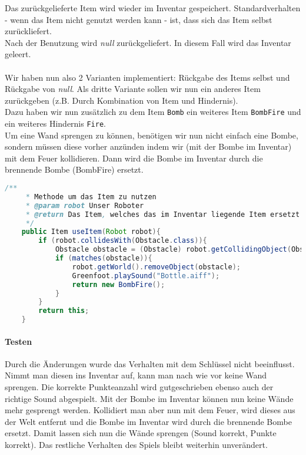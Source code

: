 \documentclass{pi1}
\begin{document}
Das zurückgelieferte Item wird wieder im Inventar gespeichert. Standardverhalten - wenn das Item nicht genutzt werden kann - ist, dass sich das Item selbst zurückliefert.\\
Nach der Benutzung wird \emph{null} zurückgeliefert. In diesem Fall wird das Inventar geleert.\\
\\
Wir haben nun also 2 Varianten implementiert: Rückgabe des Items selbst und Rückgabe von \emph{null}. Als dritte Variante sollen wir nun ein anderes Item zurückgeben (z.B. Durch Kombination von Item und Hindernis).\\
Dazu haben wir nun zusätzlich zu dem Item  \texttt{Bomb} ein weiteres Item \texttt{BombFire} und ein weiteres Hindernis \texttt{Fire}.\\
Um eine Wand sprengen zu können, benötigen wir nun nicht einfach eine Bombe, sondern müssen diese vorher anzünden indem wir (mit der Bombe im Inventar) mit dem Feuer kollidieren. Dann wird die Bombe im Inventar durch die brennende Bombe (BombFire) ersetzt.

\begin{lstlisting}[caption={Klasse \emph{Bomb}, Methode \emph{useItem()}},firstnumber=11, language=Java]
/**
     * Methode um das Item zu nutzen
     * @param robot Unser Roboter
     * @return Das Item, welches das im Inventar liegende Item ersetzt
     */
    public Item useItem(Robot robot){
        if (robot.collidesWith(Obstacle.class)){
            Obstacle obstacle = (Obstacle) robot.getCollidingObject(Obstacle.class);
            if (matches(obstacle)){
                robot.getWorld().removeObject(obstacle);
                Greenfoot.playSound("Bottle.aiff");
                return new BombFire();
            }
        }
        return this;
    }
\end{lstlisting}

\paragraph{Testen} Durch die Änderungen wurde das Verhalten mit dem Schlüssel nicht beeinflusst. Nimmt man diesen ins Inventar auf, kann man nach wie vor keine Wand sprengen. Die korrekte Punkteanzahl wird gutgeschrieben ebenso auch der richtige Sound abgespielt. Mit der Bombe im Inventar können nun keine Wände mehr gesprengt werden. Kollidiert man aber nun mit dem Feuer, wird dieses aus der Welt entfernt und die Bombe im Inventar wird durch die brennende Bombe ersetzt. Damit lassen sich nun die Wände sprengen (Sound korrekt, Punkte korrekt). Das restliche Verhalten des Spiels bleibt weiterhin unverändert.
\end{document}

